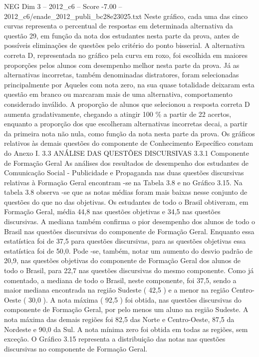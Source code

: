 \begin{textsample}{NEG Dim 3 – 2012\_c6 – Score -7.00 – 2012\_c6/enade\_2012\_publi\_bc28e23025.txt}
Neste gráfico, cada uma das cinco curvas representa o percentual de respostas em determinada alternativa da questão 29, em função da nota dos estudantes nesta parte da prova, antes de possíveis eliminações de questões pelo critério do ponto bisserial.
A alternativa correta D, representada no gráfico pela curva em roxo, foi escolhida em maiores proporções pelos alunos com desempenho melhor nesta parte da prova.
Já as alternativas incorretas, também denominadas distratores, foram selecionadas principalmente por Aqueles com nota zero, na sua quase totalidade deixaram esta questão em branco ou marcaram mais de uma alternativa, comportamento considerado inválido.
A proporção de alunos que selecionou a resposta correta D aumenta gradativamente, chegando a atingir 100 \% a partir de 22 acertos, enquanto a proporção dos que escolheram alternativas incorretas decai, a partir da primeira nota não nula, como função da nota nesta parte da prova.
Os gráficos relativos às demais questões do componente de Conhecimento Específico constam do Anexo I. 3.3 ANÁLISE DAS QUESTÕES DISCURSIVAS 3.3.1 Componente de Formação Geral As análises dos resultados de desempenho dos estudantes de Comunicação Social - Publicidade e Propaganda nas duas questões discursivas relativas à Formação Geral encontram -se na Tabela 3.8 e no Gráfico 3.15.
Na tabela 3.8 observa -se que as notas médias foram mais baixas nesse conjunto de questões do que no das objetivas.
Os estudantes de todo o Brasil obtiveram, em Formação Geral, média 44,8 nas questões objetivas e 34,5 nas questões discursivas.
A mediana também confirma o pior desempenho dos alunos de todo o Brasil nas questões discursivas do componente de Formação Geral.
Enquanto essa estatística foi de 37,5 para questões discursivas, para as questões objetivas essa estatística foi de 50,0.
Pode -se, também, notar um aumento do desvio padrão de 20,9, nas questões objetivas do componente de Formação Geral dos alunos de todo o Brasil, para 22,7 nas questões discursivas do mesmo componente.
Como já comentado, a mediana de todo o Brasil, neste componente, foi 37,5, sendo a maior mediana encontrada na região Sudeste ( 42,5 ) e a menor na região Centro-Oeste ( 30,0 ).
A nota máxima ( 92,5 ) foi obtida, nas questões discursivas do componente de Formação Geral, por pelo menos um aluno na região Sudeste.
A nota máxima das demais regiões foi 82,5 das Norte e Centro-Oeste, 87,5 da Nordeste e 90,0 da Sul.
A nota mínima zero foi obtida em todas as regiões, sem exceção.
O Gráfico 3.15 representa a distribuição das notas nas questões discursivas no componente de Formação Geral.

\end{textsample}
